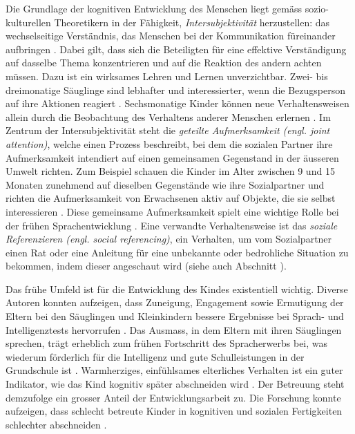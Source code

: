 Die Grundlage der kognitiven Entwicklung des Menschen liegt gemäss sozio-kulturellen Theoretikern in der Fähigkeit, \textit{Intersubjektivität} herzustellen: das wechselseitige Verständnis, das Menschen bei der Kommunikation füreinander aufbringen \cite{Gauvain2001, Rogoff1990}. Dabei gilt, dass sich die Beteiligten für eine effektive Verständigung auf dasselbe Thema konzentrieren und auf die Reaktion des andern achten müssen. Dazu ist ein wirksames Lehren und Lernen unverzichtbar. Zwei- bis dreimonatige Säuglinge sind lebhafter und interessierter, wenn die Bezugsperson auf ihre Aktionen reagiert \cite{Murray1985}. Sechsmonatige Kinder können neue Verhaltensweisen allein durch die Beobachtung des Verhaltens anderer Menschen erlernen \cite{Collie1999}. Im Zentrum der Intersubjektivität steht die \textit{geteilte Aufmerksamkeit (engl. joint attention)}, welche einen Prozess beschreibt, bei dem die sozialen Partner ihre Aufmerksamkeit intendiert auf einen gemeinsamen Gegenstand in der äusseren Umwelt richten. Zum Beispiel schauen die Kinder im Alter zwischen 9 und 15 Monaten zunehmend auf dieselben Gegenstände wie ihre Sozialpartner und richten die Aufmerksamkeit von Erwachsenen aktiv auf Objekte, die sie selbst interessieren \cite{Adamson1991, Gauvain2001}. Diese gemeinsame Aufmerksamkeit spielt eine wichtige Rolle bei der frühen Sprachentwicklung \cite[S.~232]{Berk2011}. Eine verwandte Verhaltensweise ist das \textit{soziale Referenzieren (engl. social referencing)}, ein Verhalten, um vom Sozialpartner einen Rat oder eine Anleitung für eine unbekannte oder bedrohliche Situation zu bekommen, indem dieser angeschaut wird \cite{Campos1981} (siehe auch Abschnitt \textit{}). 

Das frühe Umfeld ist für die Entwicklung des Kindes existentiell wichtig. Diverse Autoren konnten aufzeigen, dass Zuneigung, Engagement sowie Ermutigung der Eltern bei den Säuglingen und Kleinkindern bessere Ergebnisse bei Sprach- und Intelligenztests hervorrufen \cite{Fuligni2004, Linver2004, TamisLeMonda2004}. Das Ausmass, in dem Eltern mit ihren Säuglingen sprechen, trägt erheblich zum frühen Fortschritt des Spracherwerbs bei, was wiederum förderlich für die Intelligenz und gute Schulleistungen in der Grundschule ist \cite{Hart1995}. Warmherziges, einfühlsames elterliches Verhalten ist ein guter Indikator, wie das Kind kognitiv später abschneiden wird \cite[S.~225]{Berk2011}. Der Betreuung steht demzufolge ein grosser Anteil der Entwicklungsarbeit zu. Die Forschung konnte aufzeigen, dass schlecht betreute Kinder in kognitiven und sozialen Fertigkeiten schlechter abschneiden \cite{NICHD2006}.

